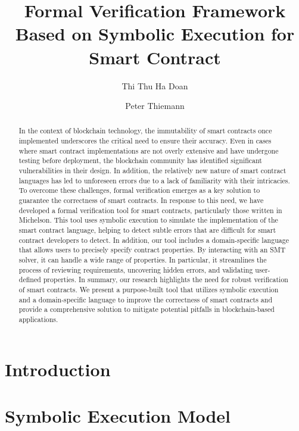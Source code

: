 \documentclass[a4paper,UKenglish,cleveref, autoref, thm-restate]{lipics-v2021}
\title{Formal Verification Framework Based on Symbolic Execution for Smart Contract} %
\author{Thi Thu Ha Doan}{University of Freiburg, Germany}{doanha@informatik.uni-freiburg.de}{https://orcid.org/0000−0001−7524−4497}{(Optional) author-specific funding acknowledgements}%
\author{Peter Thiemann}{University of Freiburg, Germany}{thiemann@informatik.uni-freiburg.de}{https://orcid.org/0000−0002−9000−1239}{[funding]}
\begin{document}
\maketitle

\begin{abstract}
In the context of blockchain technology, the immutability of smart contracts once implemented underscores the critical need to ensure their accuracy. Even in cases where smart contract implementations are not overly extensive and have undergone testing before deployment, the blockchain community has identified significant vulnerabilities in their design. In addition, the relatively new nature of smart contract languages has led to unforeseen errors due to a lack of familiarity with their intricacies. To overcome these challenges, formal verification emerges as a key solution to guarantee the correctness of smart contracts. In response to this need, we have developed a formal verification tool for smart contracts, particularly those written in Michelson. This tool uses symbolic execution to simulate the implementation of the smart contract language, helping to detect subtle errors that are difficult for smart contract developers to detect. In addition, our tool includes a domain-specific language that allows users to precisely specify contract properties. By interacting with an SMT solver, it can handle a wide range of properties. In particular, it streamlines the process of reviewing requirements, uncovering hidden errors, and validating user-defined properties. In summary, our research highlights the need for robust verification of smart contracts. We present a purpose-built tool that utilizes symbolic execution and a domain-specific language to improve the correctness of smart contracts and provide a comprehensive solution to mitigate potential pitfalls in blockchain-based applications.
\end{abstract}
\section{Introduction}
\label{sec:introduction}

\section{Symbolic Execution Model}
\label{sec:symbolic-execution-model}
\end{document}
